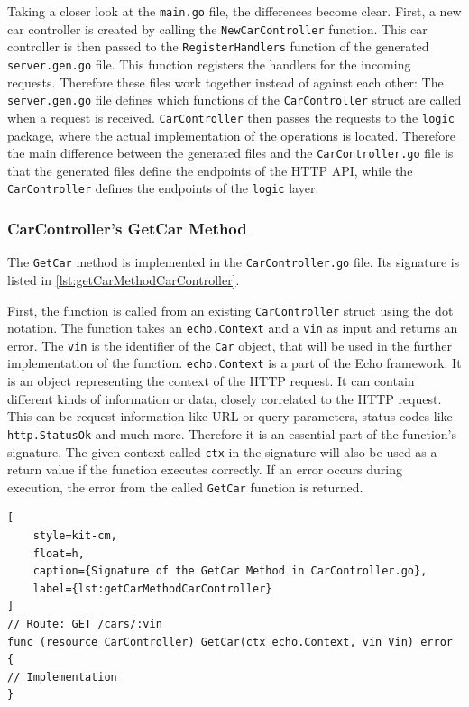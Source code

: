Taking a closer look at the \texttt{main.go} file, the differences become clear.
First, a new car controller is created by calling the \texttt{NewCarController} function.
This car controller is then passed to the \texttt{RegisterHandlers} function of the generated \texttt{server.gen.go} file.
This function registers the handlers for the incoming requests.
Therefore these files work together instead of against each other:
The \texttt{server.gen.go} file defines which functions of the \texttt{CarController} struct are called when a request is received.
\texttt{CarController} then passes the requests to the \texttt{logic} package, where the actual implementation of the operations is located.
Therefore the main difference between the generated files and the \texttt{CarController.go} file is that the generated files define the endpoints of the HTTP API, while the \texttt{CarController} defines the endpoints of the \texttt{logic} layer.

\subsubsection*{CarController's GetCar Method}
The \texttt{GetCar} method is implemented in the \texttt{CarController.go} file.
Its signature is listed in \autoref{lst:getCarMethodCarController}.

First, the function is called from an existing \texttt{CarController} struct using the dot notation.
The function takes an \texttt{echo.Context} and a \texttt{vin} as input and returns an error.
The \texttt{vin} is the identifier of the \texttt{Car} object, that will be used in the further implementation of the function.
\texttt{echo.Context} is a part of the Echo framework.
It is an object representing the context of the HTTP request.
It can contain different kinds of information or data, closely correlated to the HTTP request.
This can be request information like URL or query parameters, status codes like \texttt{http.StatusOk} and much more.
Therefore it is an essential part of the function's signature.
The given context called \texttt{ctx} in the signature will also be used as a return value if the function executes correctly.
If an error occurs during execution, the error from the called \texttt{GetCar} function is returned.

\begin{lstlisting}[
    style=kit-cm,
    float=h,
    caption={Signature of the GetCar Method in CarController.go},
    label={lst:getCarMethodCarController}
]
// Route: GET /cars/:vin
func (resource CarController) GetCar(ctx echo.Context, vin Vin) error {
// Implementation
}
\end{lstlisting}
